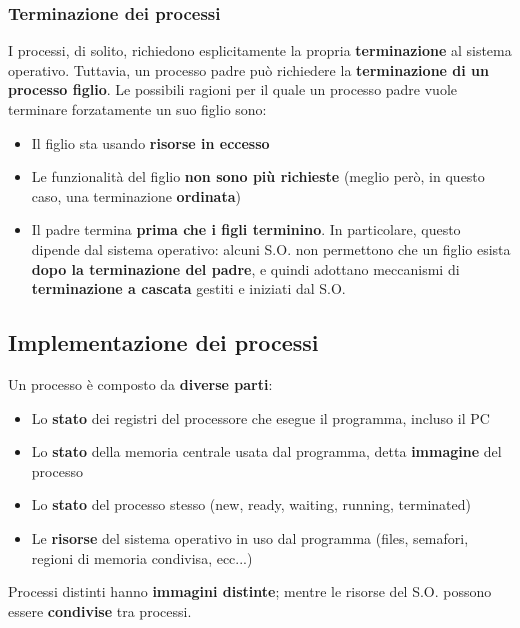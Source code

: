 \documentclass[12pt]{article}
\begin{document}
\subsubsection{Terminazione dei processi}
I processi, di solito, richiedono esplicitamente la propria \textbf{terminazione} al sistema operativo. Tuttavia, un processo padre può richiedere la \textbf{terminazione di un processo figlio}. Le possibili ragioni per il quale un processo padre vuole terminare forzatamente un suo figlio sono:
\begin{itemize}
    \item Il figlio sta usando \textbf{risorse in eccesso}
    \item Le funzionalità del figlio \textbf{non sono più richieste} (meglio però, in questo caso, una terminazione \textbf{ordinata})
    \item Il padre termina \textbf{prima che i figli terminino}. In particolare, questo dipende dal sistema operativo: alcuni S.O. non permettono che un figlio esista \textbf{dopo la terminazione del padre}, e quindi adottano meccanismi di \textbf{terminazione a cascata} gestiti e iniziati dal S.O.
\end{itemize}
\subsection{Implementazione dei processi}
Un processo è composto da \textbf{diverse parti}:
\begin{itemize}
    \item Lo \textbf{stato} dei registri del processore che esegue il programma, incluso il PC
    \item Lo \textbf{stato} della memoria centrale usata dal programma, detta \textbf{immagine} del processo
    \item Lo \textbf{stato} del processo stesso (new, ready, waiting, running, terminated)
    \item Le \textbf{risorse} del sistema operativo in uso dal programma (files, semafori, regioni di memoria condivisa, ecc...)
\end{itemize}
Processi distinti hanno \textbf{immagini distinte}; mentre le risorse del S.O. possono essere \textbf{condivise} tra processi.
\end{document}
